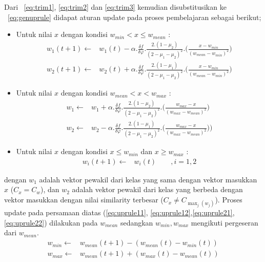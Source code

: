 Dari \equ~\ref{eq:trim1}, \ref{eq:trim2} dan \ref{eq:trim3} kemudian
disubstitusikan ke \equ~\ref{eq:genuprule} didapat aturan update pada proses
pembelajaran sebagai berikut;
\begin{itemize}
  \item Untuk nilai $x$ dengan kondisi $w_{min} < x \leq w_{mean}$ :
  	\begin{align}
	\label{eq:uprule11}
		w_1(t+1) \leftarrow & w_1(t) - \alpha .  
		\frac{\delta f}{\delta \varphi} . \frac{2.(1 - \mu_2)}{(2 - \mu_1 - \mu_2)^2}.
		\Bigg(\frac{x - w_{min}}{(w_{mean} - w_{min})^2}\Bigg) \\
	\label{eq:uprule12}
		w_2(t+1) \leftarrow & w_2(t) + \alpha .  
		\frac{\delta f}{\delta \varphi} . \frac{2.(1 - \mu_1)}{(2 - \mu_1 - \mu_2)^2}.
		\Bigg(\frac{x - w_{min}}{(w_{mean} - w_{min})^2}\Bigg) 
	\end{align}
  \item Untuk nilai $x$ dengan kondisi  $w_{mean} < x < w_{max}$ :
	\begin{align}
	\label{eq:uprule21}
		w_1 \leftarrow & w_1 + \alpha .  
		\frac{\delta f}{\delta \varphi} . \frac{2.(1 - \mu_2)}{(2 - \mu_1 - \mu_2)^2}.
		\Bigg(\frac{w_{max} - x}{(w_{max} - w_{mean})^2}\Bigg) \\
	\label{eq:uprule22}
		w_2 \leftarrow & w_2 - \alpha .  
		\frac{\delta f}{\delta \varphi} . \frac{2.(1 - \mu_1)}{(2 - \mu_1 - \mu_2)^2}.
		\Bigg(\frac{w_{max} - x}{(w_{max} - w_{mean})^2})\Bigg)
	\end{align}  
  \item Untuk nilai $x$ dengan kondisi  $x \leq w_{min}$ dan $x \geq w_{max}$ :
  	\begin{align}
	\label{eq:}
		w_i(t+1) \leftarrow & w_i(t) \qquad, i=1, 2     
	\end{align}  
\end{itemize}

\noindent dengan $w_1$ adalah vektor pewakil dari kelas yang sama dengan vektor
masukkan $x$ ($C_x = C_w$), dan $w_2$ adalah vektor pewakil dari kelas yang
berbeda dengan vektor masukkan dengan nilai similarity terbesar ($C_x \neq
C_{\max_{j}(w_j)}$). Proses update pada persamaan diatas (\ref{eq:uprule11},
\ref{eq:uprule12},\ref{eq:uprule21},\ref{eq:uprule22}) dilakukan pada $w_{mean}$
sedangkan $w_{min}, w_{max}$ mengikuti pergeseran dari $w_{mean}$. 
\begin{align}
\label{eq:upruleminmax}
	w_{min} \leftarrow & w_{mean}(t+1) - (w_{mean}(t) - w_{min}(t)) \\
	w_{max} \leftarrow & w_{mean}(t+1) + (w_{max}(t) - w_{mean}(t)) \nonumber \\
\end{align} 

